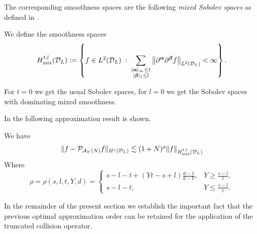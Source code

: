 The corresponding smoothness spaces are the following \emph{mixed Sobolev spaces}
as defined in \cite{Knapek2000hca}.
\begin{definition}
    We define the smoothness spaces
    \begin{equation}
        {H}_{\mathrm{mix}}^{t,l}(\mathcal{D}_L):=
        \left\{
            f\in L^2(\mathcal{D}_L) \;:\; \sum_{\substack{|{\bm\alpha}|_\infty \le t\\
            |{\bm\beta}|_1 \le l}}\left\|\partial^{\bm\alpha} 
                    \partial^{\bm\beta} f\right\|_{L^2(\mathcal{D}_L)} <\infty
        \right\}.
    \end{equation}
\end{definition}
\begin{remark}
    For $t=0$ we get the usual Sobolev spaces, for $l=0$ we get the Sobolev
    spaces with dominating mixed smoothness.
\end{remark}
In \cite{Knapek2000hca} the following approximation result is shown.
\begin{theorem}\label{thm:Knapek}
    We have
    \[
        \|f - \mathcal{P}_{\mathcal{A}_Y(N)}f\|_{H^s(\mathcal{D}_L)} \lesssim 
            (1+N)^{\rho} \|f\|_{{H}_{\mathrm{mix}}^{t,l}(\mathcal{D}_L)} 
    \]
    Where
    \begin{equation} \label{eq:hcrate}
        \rho = \rho(s,l,t,Y,d) = \begin{cases}
            s-l-t+(Yt-s+l)\frac{d-1}{d-Y},& Y\geq\frac{s-l}{t}, \\
            s-l-t,& Y\leq\frac{s-l}{t}. \end{cases}
    \end{equation}
\end{theorem}
In the remainder of the present section we establish the important fact that
the previous optimal approximation order can be retained for the application of
the truncated collision operator.

